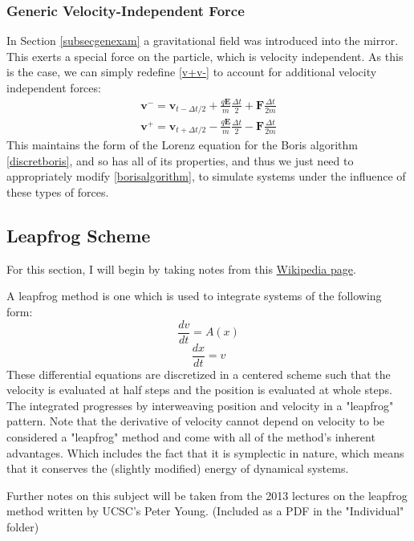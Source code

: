 \documentclass[12pt]{article}
\begin{document}
\subsubsection{Generic Velocity-Independent Force} 
In Section \ref{subsecgenexam} a gravitational field was introduced into the mirror. This exerts a special force on the particle, which is velocity independent. As this is the case, we can simply redefine \eqref{v+v-} to account for additional velocity independent forces:
\begin{equation}\label{v+v-gen}
\begin{split}
\textbf{v}^-=\textbf{v}_{t-\Delta t/2}+\frac{q\textbf{E}}{m}\frac{\Delta t}{2}+\textbf{F}\frac{\Delta t}{2m}\\
\textbf{v}^+=\textbf{v}_{t+\Delta t/2}-\frac{q\textbf{E}}{m}\frac{\Delta t}{2}-\textbf{F}\frac{\Delta t}{2m}
\end{split}
\end{equation}
This maintains the form of the Lorenz equation for the Boris algorithm \eqref{discretboris}, and so has all of its properties, and thus we just need to appropriately modify \eqref{borisalgorithm}, to simulate systems under the influence of these types of forces. 

\subsection{Leapfrog Scheme}
For this section, I will begin by taking notes from this \href{https://en.wikipedia.org/wiki/Leapfrog_integration}{Wikipedia page}. 

A leapfrog method is one which is used to integrate systems of the following form:
$$\frac{dv}{dt}=A(x)$$
$$\frac{dx}{dt}=v$$
These differential equations are discretized in a centered scheme such that the velocity is evaluated at half steps and the position is evaluated at whole steps. The integrated progresses by interweaving position and velocity in a "leapfrog" pattern. Note that the derivative of velocity cannot depend on velocity to be considered a "leapfrog" method and come with all of the method's inherent advantages. Which includes the fact that it is symplectic in nature, which means that it conserves the (slightly modified) energy of dynamical systems.

Further notes on this subject will be taken from the 2013 lectures on the leapfrog method written by UCSC's Peter Young. (Included as a PDF in the "Individual" folder)
\end{document}

